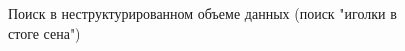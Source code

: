 \begin{figure}
\centering



\caption{Поиск в неструктурированном объеме данных (поиск "иголки в
  стоге сена")}
\label{figQuantCompSearch}
\end{figure}

